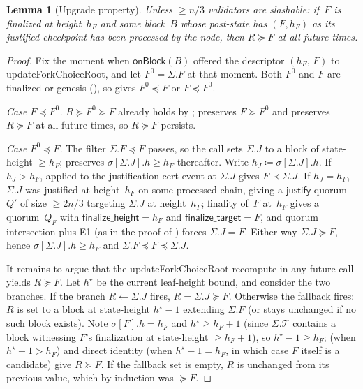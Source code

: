 \ifx\litemode\undefined\documentclass{article}\fi
\newcommand{\T}[0]{\ensuremath{\mathcal{T}}}
\newcommand{\just}{\ensuremath{\mathsf{justify}}\xspace}
\newcommand{\finalizeHeight}{\mathsf{finalize\_height}}
\newcommand{\finalizeTarget}{\mathsf{finalize\_target}}
\newcommand{\onBlock}{\textsf{onBlock}\xspace}
\newcommand{\updateForkChoiceRoot}{\textsf{updateForkChoiceRoot}\xspace}
\theoremstyle{plain}
\newtheorem{lemma}{Lemma}
\theoremstyle{definition}
\theoremstyle{remark}
\begin{document}
\begin{lemma}[Upgrade property]\label{lem:upgrade}
Unless $\geq n/3$ validators are slashable: if~$F$ is finalized at height~$h_F$ and some block~$B$ whose post-state has $(F, h_F)$ as its justified checkpoint has been processed by the node, then $R \succeq F$ at all future times.
\end{lemma}

\begin{proof}
Fix the moment when $\onBlock(B)$ offered the descriptor $(h_F,\, F)$ to \updateForkChoiceRoot, and let $F^0 = \Sigma.F$ at that moment.
Both $F^0$ and $F$ are finalized or genesis (), so  gives $F^0 \preceq F$ or $F \preceq F^0$.

\emph{Case $F \preceq F^0$.}
$R \succeq F^0 \succeq F$ already holds by ;  preserves $F \succeq F^0$ and  preserves $R \succeq F$ at all future times, so $R \succeq F$ persists.

\emph{Case $F^0 \preceq F$.}
The filter $\Sigma.F \preceq F$ passes, so the call sets $\Sigma.J$ to a block of state-height $\geq h_F$;  preserves $\sigma[\Sigma.J].h \geq h_F$ thereafter.
Write $h_J \coloneqq \sigma[\Sigma.J].h$.
If $h_J > h_F$,  applied to the justification cert event at $\Sigma.J$ gives $F \prec \Sigma.J$.
If $h_J = h_F$, $\Sigma.J$ was justified at height~$h_F$ on some processed chain, giving a \just-quorum~$Q'$ of size $\geq 2n/3$ targeting $\Sigma.J$ at height~$h_F$; finality of~$F$ at~$h_F$ gives a quorum~$Q_F$ with $\finalizeHeight = h_F$ and $\finalizeTarget = F$, and quorum intersection plus E1 (as in the proof of ) forces $\Sigma.J = F$.
Either way $\Sigma.J \succeq F$, hence $\sigma[\Sigma.J].h \geq h_F$ and $\Sigma.F \preceq F \preceq \Sigma.J$.

It remains to argue that the \updateForkChoiceRoot recompute in any future call yields $R \succeq F$.
Let $h^\star$ be the current leaf-height bound, and consider the two branches.
If the branch $R \gets \Sigma.J$ fires, $R = \Sigma.J \succeq F$.
Otherwise the fallback fires: $R$ is set to a block at state-height $h^\star - 1$ extending $\Sigma.F$ (or stays unchanged if no such block exists).
Note $\sigma[F].h = h_F$ and $h^\star \geq h_F + 1$ (since $\Sigma.\T$ contains a block witnessing $F$'s finalization at state-height $\geq h_F + 1$), so $h^\star - 1 \geq h_F$;  (when $h^\star - 1 > h_F$) and direct identity (when $h^\star - 1 = h_F$, in which case $F$ itself is a candidate) give $R \succeq F$.
If the fallback set is empty, $R$ is unchanged from its previous value, which by induction was $\succeq F$.
\end{proof}
\end{document}

